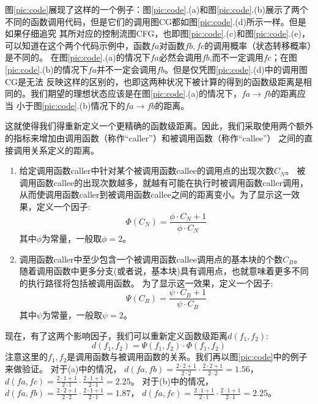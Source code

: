 \documentclass[bachelor]{njupthesis}
\begin{document}
图\ref{pic:code}展现了这样的一个例子：图\ref{pic:code}.(a)和图\ref{pic:code}.(b)展示了两个不同的函数调用代码，但是它们的调用图CG都如图\ref{pic:code}.(d)所示一样。但是如果仔细追究
其所对应的控制流图CFG，也即图\ref{pic:code}.(c)和图\ref{pic:code}.(e)，可以知道在这个两个代码示例中，函数$fa$对函数$fb,fc$的调用概率（状态转移概率）是不同的。
在图\ref{pic:code}.(a)的情况下$fa$必然会调用$fb$,而不一定调用$fc$；在图\ref{pic:code}.(b)的情况下$fa$并不一定会调用$fb$。但是仅凭图\ref{pic:code}.(d)中的调用图CG是无法
反映这样的区别的，也即这两种状况下被计算的得到的函数级距离是相同的。我们期望的理想状态应该是在图\ref{pic:code}.(a)的情况下，$fa \to fb$的距离应当
小于图\ref{pic:code}.(b)情况下的$fa \to fb$的距离。

这就使得我们得重新定义一个更精确的函数级距离。因此，我们采取使用两个额外的指标来增加由调用函数（称作“caller”）和被调用函数（称作“callee”）
之间的直接调用关系定义的距离。
\begin{enumerate}[label=(\arabic*),leftmargin=48pt]
	\item 给定调用函数caller中针对某个被调用函数callee的调用点的出现次数$C_N$。
	被调用函数callee的出现次数越多，就越有可能在执行时被调用函数caller调用，
	从而使调用函数caller到被调用函数callee之间的距离变小。为了显示这一效果，定义一个因子:
	\begin{equation}\label{eq:factor1}
	\Phi (C_N)=\frac{\phi \cdot C_N+1}{\phi \cdot C_N}
	\end{equation}
	其中$\phi$为常量，一般取$\phi=2$。
	\item 调用函数caller中至少包含一个被调用函数callee调用点的基本块的个数$C_B$。
	随着调用函数中更多分支(或者说，基本块)具有调用点，也就意味着更多不同的执行路径将包括被调用函数。
	为了显示这一效果，定义一个因子:
	\begin{equation}\label{eq:factor2}
	\Psi (C_B)=\frac{\psi \cdot C_B+1}{\psi \cdot C_B}
	\end{equation}
	其中$\psi$为常量，一般取$\psi=2$。	
\end{enumerate}

现在，有了这两个影响因子，我们可以重新定义函数级距离$d(f_1,f_2)$:
\begin{equation}\label{eq:ffdis}
	d(f_1,f_2)=\Psi (f_1,f_2)\cdot \Phi (f_1,f_2) 
\end{equation}
注意这里的$f_1,f_2$是调用函数与被调用函数的关系。我们再以图\ref{pic:code}中的例子来做验证。
对于(a)中的情况，
$d(fa,fb)=\frac{2\cdot 2+1}{2\cdot 2} \cdot \frac{2\cdot 2+1}{2\cdot 2} = 1.56$，
$d(fa,fc)=\frac{2\cdot 1+1}{2\cdot 1} \cdot \frac{2\cdot 1+1}{2\cdot 1} = 2.25$。
对于(b)中的情况，
$d(fa,fb)=\frac{2\cdot 2+1}{2\cdot 2} \cdot \frac{2\cdot 1+1}{2\cdot 1} = 1.87$，
$d(fa,fc)=\frac{2\cdot 1+1}{2\cdot 1} \cdot \frac{2\cdot 1+1}{2\cdot 1} = 2.25$。
\end{document}
